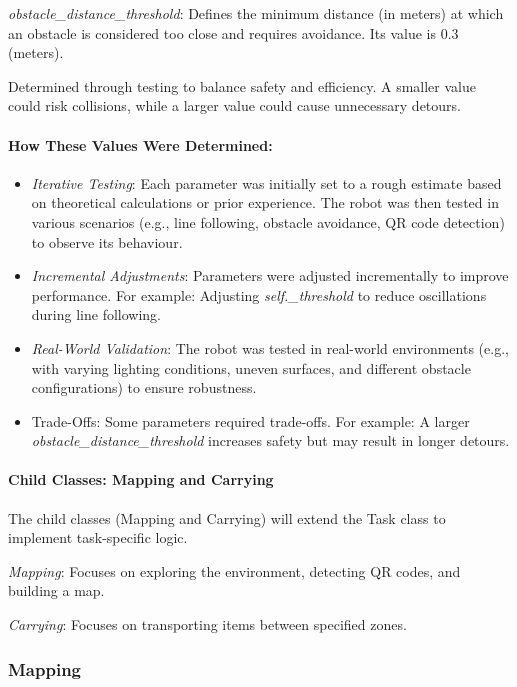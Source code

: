 \documentclass[a4paper,12pt]{extreport}
\begin{document}
\emph{obstacle\_distance\_threshold}: Defines the minimum distance (in
meters) at which an obstacle is considered too close and requires
avoidance. Its value is 0.3 (meters).

Determined through testing to balance safety and efficiency. A smaller
value could risk collisions, while a larger value could cause
unnecessary detours.

\paragraph{How These Values Were Determined:}

\begin{itemize}
\item
  \emph{Iterative Testing}: Each parameter was initially set to a rough
  estimate based on theoretical calculations or prior experience. The
  robot was then tested in various scenarios (e.g., line following,
  obstacle avoidance, QR code detection) to observe its behaviour.
\item
  \emph{Incremental Adjustments}: Parameters were adjusted incrementally
  to improve performance. For example: Adjusting \emph{self.\_threshold}
  to reduce oscillations during line following.
\item
  \emph{Real-World Validation}: The robot was tested in real-world
  environments (e.g., with varying lighting conditions, uneven surfaces,
  and different obstacle configurations) to ensure robustness.
\item
  Trade-Offs: Some parameters required trade-offs. For example: A larger
  \emph{obstacle\_distance\_threshold} increases safety but may result
  in longer detours.
\end{itemize}

\paragraph{Child Classes: Mapping and Carrying}

The child classes (Mapping and Carrying) will extend the Task class to
implement task-specific logic.

\emph{Mapping}: Focuses on exploring the environment, detecting QR
codes, and building a map.

\emph{Carrying}: Focuses on transporting items between specified zones.

\subsubsection{Mapping}
\end{document}

